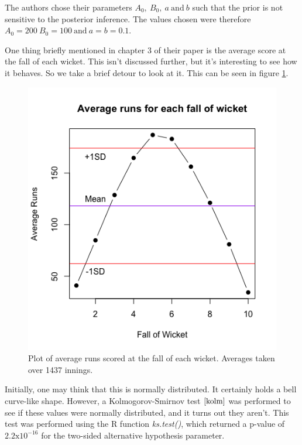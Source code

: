 The authors chose their parameters $A_0, \ B_0, \ a \ \text{and} \ b$ such that the prior is not sensitive to the posterior inference. The values chosen
were therefore $A_0=200 \ B_0=100 \ \text{and} \ a=b=0.1$.

One thing briefly mentioned in chapter 3 of their paper is the average score at the fall of each wicket. This isn't discussed further, but it's interesting to see how it behaves.
So we take a brief detour to look at it. This can be seen in figure \ref{avgrunsfow}.

\begin{figure}[h]
    \centering
    \includegraphics[scale=0.6]{figures/avgrunsfow.png}
    \caption{Plot of average runs scored at the fall of each wicket. Averages taken over 1437 innings.}
    \label{avgrunsfow}
\end{figure}

Initially, one may think that this is normally distributed. It certainly holds a bell curve-like shape. However, a Kolmogorov-Smirnov test $\cite{kolm}$ was
performed to see if these values were normally distributed, and it turns out they aren't. This test was performed using the R function \textit{ks.test()}, which returned
a p-value of $2.2\text{x}10^{-16}$ for the two-sided alternative hypothesis parameter. \\

